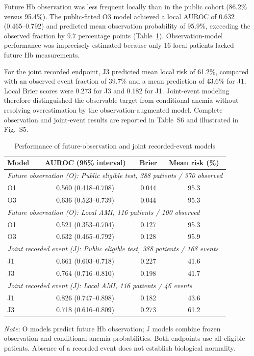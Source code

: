 \documentclass[pdflatex,sn-mathphys-num]{sn-jnl}%
\theoremstyle{thmstyleone}%
\theoremstyle{thmstyletwo}%
\theoremstyle{thmstylethree}%
\begin{document}
Future Hb observation was less frequent locally than in the public cohort (86.2\% versus 95.4\%). The public-fitted O3 model achieved a local AUROC of 0.632 (0.465--0.792) and predicted mean observation probability of 95.9\%, exceeding the observed fraction by 9.7 percentage points (Table~\ref{tab:twostage}). Observation-model performance was imprecisely estimated because only 16 local patients lacked future Hb measurements.

For the joint recorded endpoint, J3 predicted mean local risk of 61.2\%, compared with an observed event fraction of 39.7\% and a mean prediction of 43.6\% for J1. Local Brier scores were 0.273 for J3 and 0.182 for J1. Joint-event modeling therefore distinguished the observable target from conditional anemia without resolving overestimation by the observation-augmented model. Complete observation and joint-event results are reported in Table~S6 and illustrated in Fig.~S5.

\begin{table}[!t]
\caption{Performance of future-observation and joint recorded-event models}
\label{tab:twostage}
\centering
\footnotesize
\setlength{\tabcolsep}{3pt}
\begin{tabular}{lccc}
\toprule
Model & AUROC (95\% interval) & Brier & Mean risk (\%)\\
\midrule
\multicolumn{4}{l}{\textit{Future observation (O): Public eligible test, 388 patients / 370 observed}}\\
O1 & 0.560 (0.418--0.708) & 0.044 & 95.3\\
O3 & 0.636 (0.523--0.739) & 0.044 & 95.3\\
\multicolumn{4}{l}{\textit{Future observation (O): Local AMI, 116 patients / 100 observed}}\\
O1 & 0.521 (0.353--0.704) & 0.127 & 95.3\\
O3 & 0.632 (0.465--0.792) & 0.128 & 95.9\\
\multicolumn{4}{l}{\textit{Joint recorded event (J): Public eligible test, 388 patients / 168 events}}\\
J1 & 0.661 (0.603--0.718) & 0.227 & 41.6\\
J3 & 0.764 (0.716--0.810) & 0.198 & 41.7\\
\multicolumn{4}{l}{\textit{Joint recorded event (J): Local AMI, 116 patients / 46 events}}\\
J1 & 0.826 (0.747--0.898) & 0.182 & 43.6\\
J3 & 0.718 (0.616--0.809) & 0.273 & 61.2\\
\bottomrule
\end{tabular}

\vspace{2mm}
\parbox{\textwidth}{\footnotesize
\textit{Note:} O models predict future Hb observation; J models
combine frozen observation and conditional-anemia probabilities.
Both endpoints use all eligible patients. Absence of a recorded
event does not establish biological normality.
}
\end{table}
\end{document}
